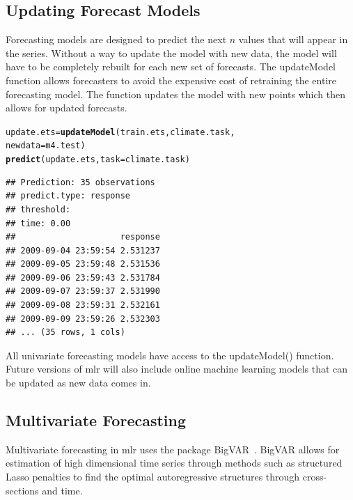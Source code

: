 \documentclass[12pt]{article}\usepackage[]{graphicx}\usepackage[]{color}
\makeatletter
\newcommand{\hlstd}[1]{\textcolor[rgb]{0.345,0.345,0.345}{#1}}%
\newcommand{\hlkwb}[1]{\textcolor[rgb]{0.69,0.353,0.396}{#1}}%
\newcommand{\hlkwc}[1]{\textcolor[rgb]{0.333,0.667,0.333}{#1}}%
\newcommand{\hlkwd}[1]{\textcolor[rgb]{0.737,0.353,0.396}{\textbf{#1}}}%
\newenvironment{kframe}{%
 \def\at@end@of@kframe{}%
 \ifinner\ifhmode%
  \def\at@end@of@kframe{\end{minipage}}%
  \begin{minipage}{\columnwidth}%
 \fi\fi%
 \def\FrameCommand##1{\hskip\@totalleftmargin \hskip-\fboxsep
 \colorbox{shadecolor}{##1}\hskip-\fboxsep
     \hskip-\linewidth \hskip-\@totalleftmargin \hskip\columnwidth}%
 \MakeFramed {\advance\hsize-\width
   \@totalleftmargin\z@ \linewidth\hsize
   \@setminipage}}%
 {\par\unskip\endMakeFramed%
 \at@end@of@kframe}
\newenvironment{knitrout}{}{} %
\theoremstyle{definition}
\newcommand\code{\@codex}
\def\@codex#1{{\normalfont\ttfamily\hyphenchar\font=-1 #1}}
\newcommand{\pkg}[1]{{\fontseries{b}\selectfont #1}}
\makeatother
\begin{document}
\subsection{Updating Forecast Models}

 Forecasting models are designed to predict the next $n$ values that will appear in the series. Without a way to update the model with new data, the model will have to be completely rebuilt for each new set of forecasts. The \code{updateModel} function allows forecasters to avoid the expensive cost of retraining the entire forecasting model. The function updates the model with new points which then allows for updated forecasts. 

\singlespacing
\begin{knitrout}
\color{fgcolor}\begin{kframe}
\begin{alltt}
\hlstd{update.ets} \hlkwb{=} \hlkwd{updateModel}\hlstd{(train.ets, climate.task,}
                           \hlkwc{newdata} \hlstd{= m4.test)}
\hlkwd{predict}\hlstd{(update.ets,} \hlkwc{task} \hlstd{= climate.task)}
\end{alltt}
\begin{verbatim}
## Prediction: 35 observations
## predict.type: response
## threshold: 
## time: 0.00
##                     response
## 2009-09-04 23:59:54 2.531237
## 2009-09-05 23:59:48 2.531536
## 2009-09-06 23:59:43 2.531784
## 2009-09-07 23:59:37 2.531990
## 2009-09-08 23:59:31 2.532161
## 2009-09-09 23:59:26 2.532303
## ... (35 rows, 1 cols)
\end{verbatim}
\end{kframe}
\end{knitrout}
\doublespacing

All univariate forecasting models have access to the \code{updateModel()} function. Future versions of \code{mlr} will also include online machine learning models that can be updated as new data comes in.

\subsection{Multivariate Forecasting}
\label{seq:buildAndTuneMulti}

Multivariate forecasting in \pkg{mlr} uses the package \pkg{BigVAR}~\cite{bigvarpaper}. \pkg{BigVAR} allows for estimation of high dimensional time series through methods such as structured Lasso penalties to find the optimal autoregressive structures through cross-sections and time.
\end{document}
